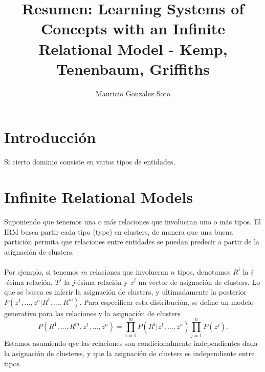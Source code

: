 \documentclass[11pt]{article}
\title{Resumen: Learning Systems of Concepts with an Infinite Relational Model - Kemp, Tenenbaum, Griffiths}
\author{Mauricio Gonzalez Soto}
\theoremstyle{plain}
\begin{document}
\nocite{*}
\maketitle
\section{Introducción}
Si cierto dominio consiste en varios tipos de entidades,
\section{Infinite Relational Models}
Suponiendo que tenemos una o más relaciones que involucran uno o más tipos. El IRM busca partir cada tipo (type) en clusters, de manera que una buena partición permita que relaciones entre entidades se puedan predecir a partir de la asignación de clusters.\\
\\
Por ejemplo, si tenemos $m$ relaciones que involucran $n$ tipos, denotamos $R^i$ la $i$-ésima relación, $T^j$ la $j$-ésima relación y $z^j$ un vector de asignación de clusters. Lo que se busca es inferir la asignación de clusters, y ultimadamente la posterior $P(z^1,...,z^n | R^1, ... , R^m)$. Para especificar esta distribución, se define un modelo generativo para las relaciones y la asignación de clusters
\[ P(R^1,...,R^m, z^1,...,z^n) = \prod_{i=1}^m P(R^i | z^1 , ... , z^n) \prod_{j=1}^n P(z^j). \]
Estamos asumiendo qye las relaciones son condicionalmente independientes dada la asignación de clusterss, y que la asignación de clusters es independiente entre tipos.
\end{document}
